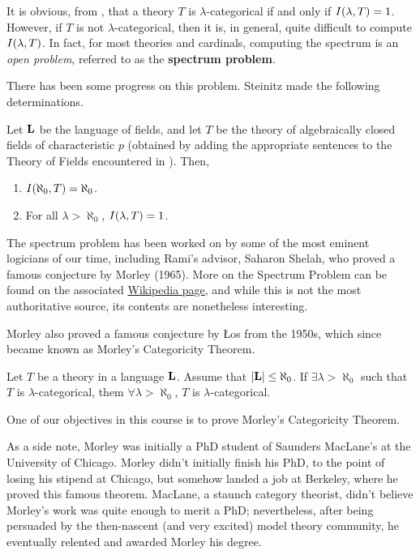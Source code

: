 It is obvious, from , that a theory $T$ is $\lambda$-categorical if and only if $I\!\left( \lambda, T \right) = 1$. However, if $T$ is not $\lambda$-categorical, then it is, in general, quite difficult to compute $I\!\left( \lambda, T \right)$. In fact, for most theories and cardinals, computing the spectrum is an \textit{open problem}, referred to as the \textbf{spectrum problem}.

There has been some progress on this problem. Steinitz made the following determinations.

\begin{boxtheorem}[Steinitz]
    Let $\mathbf{L}$ be the language of fields, and let $T$ be the theory of algebraically closed fields of characteristic $p$ (obtained by adding the appropriate sentences to the Theory of Fields encountered in ). Then,
    \begin{enumerate}[label = \normalfont \arabic*.]
        \item $I\!\left( \aleph_{0}, T \right) = \aleph_{0}$.
        \item For all $\lambda > \aleph_{0}$, $I\!\left( \lambda, T \right) = 1$.
    \end{enumerate}
\end{boxtheorem}

The spectrum problem has been worked on by some of the most eminent logicians of our time, including Rami's advisor, Saharon Shelah, who proved a famous conjecture by Morley (1965). More on the Spectrum Problem can be found on the associated \href{https://en.wikipedia.org/wiki/Spectrum_of_a_theory#:~:text=More%20precisely%2C%20for%20any%20complete,of%20a%20countable%20theory%20T.}{Wikipedia page}, and while this is not the most authoritative source, its contents are nonetheless interesting.

Morley also proved a famous conjecture by Łos from the 1950s, which since became known as Morley's Categoricity Theorem.

\begin{boxtheorem}
    Let $T$ be a theory in a language $\mathbf{L}$. Assume that $\left\lvert \mathbf{L} \right\rvert \leq \aleph_{0}$. If $\exists \lambda > \aleph_{0}$ such that $T$ is $\lambda$-categorical, them $\forall \lambda > \aleph_{0}$, $T$ is $\lambda$-categorical.
\end{boxtheorem}

One of our objectives in this course is to prove Morley's Categoricity Theorem.

As a side note, Morley was initially a PhD student of Saunders MacLane's at the University of Chicago. Morley didn't initially finish his PhD, to the point of losing his stipend at Chicago, but somehow landed a job at Berkeley, where he proved this famous theorem. MacLane, a staunch category theorist, didn't believe Morley's work was quite enough to merit a PhD; nevertheless, after being persuaded by the then-nascent (and very excited) model theory community, he eventually relented and awarded Morley his degree.